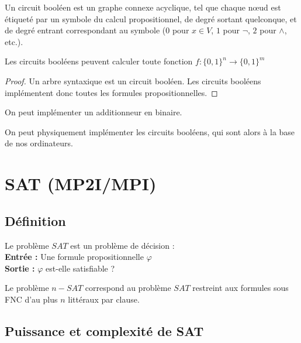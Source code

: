 \begin{appl}
	Un circuit booléen est un graphe connexe acyclique, tel que chaque nœud est étiqueté par un symbole du calcul propositionnel, de degré sortant quelconque, et de degré entrant correspondant au symbole ($0$ pour $x\in V$, $1$ pour $\neg$, $2$ pour $\wedge$, etc.).\\
\end{appl}

\begin{theorem}
	Les circuits booléens peuvent calculer toute fonction $f :\{0,1\}^n \to \{0,1\}^m$
\end{theorem}
\begin{proof}
	Un arbre syntaxique est un circuit booléen. Les circuits booléens implémentent donc toutes les formules propositionnelles.
\end{proof}

\begin{example}
	On peut implémenter un additionneur en binaire.
\end{example}

\begin{rem}
	On peut physiquement implémenter les circuits booléens, qui sont alors à la base de nos ordinateurs.
\end{rem}

\section{SAT (MP2I/MPI)}

\subsection{Définition}

\begin{definition}
	Le problème $SAT$ est un problème de décision :\\
	\textbf{Entrée :} Une formule propositionnelle $\varphi$\\
	\textbf{Sortie :} $\varphi$ est-elle satisfiable ?
\end{definition}

\begin{rem}
	Le problème $n-SAT$ correspond au problème $SAT$ restreint aux formules sous FNC d'au plus $n$ littéraux par clause.
\end{rem}

\subsection{Puissance et complexité de SAT}

